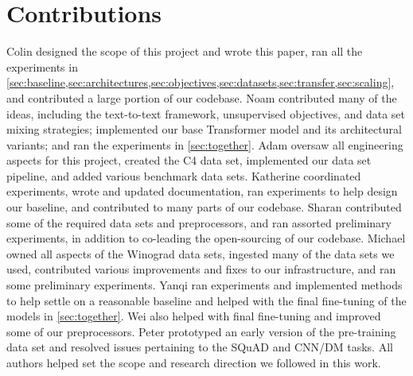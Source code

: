 \documentclass[twoside,11pt]{article}
\begin{document}

\clearpage

\appendix

\section{Contributions}
\label{sec:contributions}

Colin designed the scope of this project and wrote this paper, ran all the experiments in \cref{sec:baseline,sec:architectures,sec:objectives,sec:datasets,sec:transfer,sec:scaling}, and contributed a large portion of our codebase.
Noam contributed many of the ideas, including the text-to-text framework, unsupervised objectives, and data set mixing strategies; implemented our base Transformer model and its architectural variants; and ran the experiments in \cref{sec:together}.
Adam oversaw all engineering aspects for this project, created the C4 data set, implemented our data set pipeline, and added various benchmark data sets.
Katherine coordinated experiments, wrote and updated documentation, ran experiments to help design our baseline, and contributed to many parts of our codebase.
Sharan contributed some of the required data sets and preprocessors, and ran assorted preliminary experiments, in addition to co-leading the open-sourcing of our codebase.
Michael owned all aspects of the Winograd data sets, ingested many of the data sets we used, contributed various improvements and fixes to our infrastructure, and ran some preliminary experiments.
Yanqi ran experiments and implemented methods to help settle on a reasonable baseline and helped with the final fine-tuning of the models in \cref{sec:together}.
Wei also helped with final fine-tuning and improved some of our preprocessors.
Peter prototyped an early version of the pre-training data set and resolved issues pertaining to the SQuAD and CNN/DM tasks.
All authors helped set the scope and research direction we followed in this work.
\end{document}
